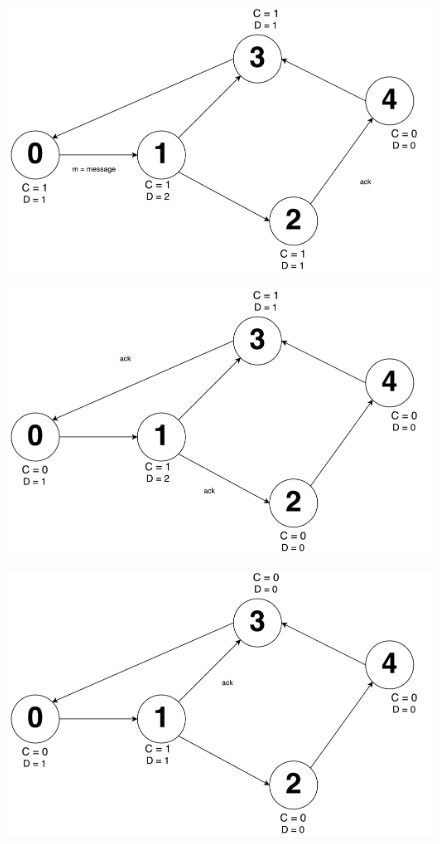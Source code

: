 \documentclass[times]{article}
\begin{document}
		\begin{figure}[H]
			\includegraphics[width=\linewidth]{q2/6.pdf}
		\end{figure}
		\begin{figure}[H]
			\includegraphics[width=\linewidth]{q2/7.pdf}
		\end{figure}
		\begin{figure}[H]
			\includegraphics[width=\linewidth]{q2/8.pdf}
		\end{figure}
\end{document}
